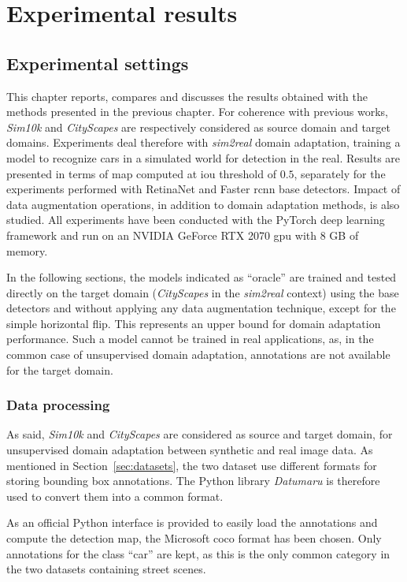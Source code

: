 \documentclass[%
    corpo=12pt,
    twoside,
    stile=classica,   
    tipotesi=magistrale,
    evenboxes,
    english,
	numerazioneromana,
]{toptesi}
\newcommand{\quotes}[1]{``#1''}
\begin{document}
\chapter{Experimental results}
\section{Experimental settings}
This chapter reports, compares and discusses the results obtained with the methods presented in the previous chapter. For coherence with previous works, \textit{Sim10k} and \textit{CityScapes} are respectively considered as source domain and target domains. Experiments deal therefore with \textit{sim2real} domain adaptation, training a model to recognize cars in a simulated world for detection in the real. Results are presented in terms of \gls{map} computed at \gls{iou} threshold of $ 0.5 $, separately for the experiments performed with RetinaNet and Faster \gls{rcnn} base detectors. Impact of data augmentation operations, in addition to domain adaptation methods, is also studied. All experiments have been conducted with the PyTorch deep learning framework and run on an NVIDIA GeForce RTX 2070 \gls{gpu} with 8 GB of memory.

\bigskip
In the following sections, the models indicated as \quotes{oracle} are trained and tested directly on the target domain (\textit{CityScapes} in the \textit{sim2real} context) using the base detectors and without applying any data augmentation technique, except for the simple horizontal flip. This represents an upper bound for domain adaptation performance. Such a model cannot be trained in real applications, as, in the common case of unsupervised domain adaptation, annotations are not available for the target domain.

\subsection{Data processing}
As said, \textit{Sim10k} and \textit{CityScapes} are considered as source and target domain, for unsupervised domain adaptation between synthetic and real image data. As mentioned in Section~\ref{sec:datasets}, the two dataset use different formats for storing bounding box annotations. The Python library \textit{Datumaru}\cite{datumaro} is therefore used to convert them into a common format.

\medskip
As an official Python interface is provided to easily load the annotations and compute the detection \gls{map}, the Microsoft \gls{coco} format has been chosen. Only annotations for the class \quotes{car} are kept, as this is the only common category in the two datasets containing street scenes.
\end{document}
